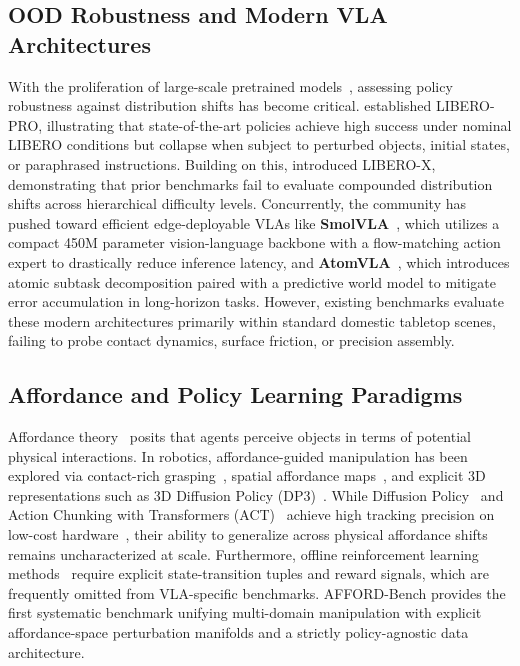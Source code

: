 \documentclass[conference]{IEEEtran}
\begin{document}
\subsection{OOD Robustness and Modern VLA Architectures}
With the proliferation of large-scale pretrained models~\cite{padalkar2023openx, brohan2022rt1, brohan2023rt2, kim2024openvla, octo2023}, assessing policy robustness against distribution shifts has become critical. \citet{zhou2026liberopro} established LIBERO-PRO, illustrating that state-of-the-art policies achieve high success under nominal LIBERO conditions but collapse when subject to perturbed objects, initial states, or paraphrased instructions. Building on this, \citet{wang2026liberox} introduced LIBERO-X, demonstrating that prior benchmarks fail to evaluate compounded distribution shifts across hierarchical difficulty levels. Concurrently, the community has pushed toward efficient edge-deployable VLAs like \textbf{SmolVLA}~\cite{smolvla2025}, which utilizes a compact 450M parameter vision-language backbone with a flow-matching action expert to drastically reduce inference latency, and \textbf{AtomVLA}~\cite{atomvla2025}, which introduces atomic subtask decomposition paired with a predictive world model to mitigate error accumulation in long-horizon tasks. However, existing benchmarks evaluate these modern architectures primarily within standard domestic tabletop scenes, failing to probe contact dynamics, surface friction, or precision assembly.

\subsection{Affordance and Policy Learning Paradigms}
Affordance theory~\cite{gibson1979ecological} posits that agents perceive objects in terms of potential physical interactions. In robotics, affordance-guided manipulation has been explored via contact-rich grasping~\cite{song2023grasping}, spatial affordance maps~\cite{shridhar2022cliport}, and explicit 3D representations such as 3D Diffusion Policy (DP3)~\cite{ze2024dp3}. While Diffusion Policy~\cite{chi2023diffusion} and Action Chunking with Transformers (ACT)~\cite{zhao2023act} achieve high tracking precision on low-cost hardware~\cite{fu2024mobilealoha}, their ability to generalize across physical affordance shifts remains uncharacterized at scale. Furthermore, offline reinforcement learning methods~\cite{kumar2020cql} require explicit state-transition tuples and reward signals, which are frequently omitted from VLA-specific benchmarks. AFFORD-Bench provides the first systematic benchmark unifying multi-domain manipulation with explicit affordance-space perturbation manifolds and a strictly policy-agnostic data architecture.
\end{document}

